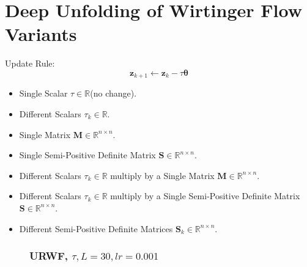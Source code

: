 \documentclass{beamer}
\theoremstyle{definition}
\theoremstyle{remark}
\begin{document}
\section[DU/AU of WF*]{Deep Unfolding of Wirtinger Flow Variants}
\begin{frame}
  Update Rule:
  \begin{equation*}
    \boldsymbol{z}_{k+1} \leftarrow \boldsymbol{z}_k - \tau\boldsymbol{\theta}
  \end{equation*}

  
  
  \begin{itemize}
    \item Single Scalar $\tau \in \mathbb{R}$(no change).
    \item Different Scalars $\tau_k\in\mathbb{R}$.
    \item Single Matrix $\boldsymbol{M}\in \mathbb{R}^{n\times n}$.
    \item Single Semi-Positive Definite Matrix $\boldsymbol{S}\in \mathbb{R}^{n\times n}$.
    \item Different Scalars $\tau_k \in \mathbb{R}$ multiply by a Single Matrix $\boldsymbol{M} \in \mathbb{R}^{n\times n}$.
    \item Different Scalars $\tau_k \in \mathbb{R}$ multiply by a Single Semi-Positive Definite Matrix $\boldsymbol{S} \in \mathbb{R}^{n\times n}$.
    \item Different Semi-Positive Definite Matrices $\boldsymbol{S}_k\in \mathbb{R}^{n\times n}$.
  \end{itemize}
\end{frame}
\begin{frame}
  \begin{figure}
    \frametitle{URWF, $\tau,L=30,lr=0.001$}
    \centering
    \resizebox{0.9\textwidth}{!}{}
    \label{fig:rwf_s_00_l_30_lr_0.001}
  \end{figure}
\end{frame}
\end{document}
